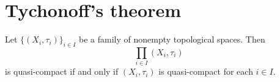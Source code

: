 \section{Tychonoff's theorem}

\begin{theorem}\label{theorem:Tychonoff_theorem}
Let $\big\{\left(X_i,\tau_i\right)\big\}_{i\in I}$ be a family of nonempty topological spaces. Then 
$$\prod_{i\in I}\left(X_i,\tau_i\right)$$
is quasi-compact if and only if $\left(X_i,\tau_i\right)$ is quasi-compact for each $i\in I$.
\end{theorem}











\small



